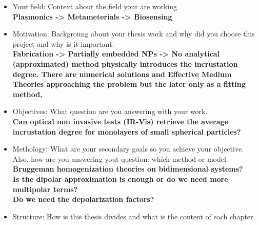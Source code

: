 \begin{itemize}
	\item Your field: Context about the field your are working \\
	\textbf{Plasmonics -> Metameterials -> Biosensing}
	\item Motivation: Backgroung about your thesis work and why did you choose this project and why is it important.\\
	\textbf{Fabrication -> Partially embedded NPs -> No analytical (approximated) method physically introduces the incrustation degree. There are numerical solutions and Effective Medium Theories approaching the problem but the later only as a fitting method. }
	\item Objectives: What question are you answering with your work.\\
	\textbf{Can optical non invasive tests (IR-Vis) retrieve the average incrustation degree for monolayers of small spherical particles?}
	\item Methology: What are your secondary goals so you achieve your objective. Also, how are you answering yout question: which method or model.\\
	\textbf{Bruggeman homogenization theories on bidimensional systems?\\
	Is the dipolar approximation is enough or do we need more multipolar terms?\\
	Do we need the depolarization factors?}
	\item Structure: How is this thesis divides and what is the content of each chapter.
\end{itemize}
